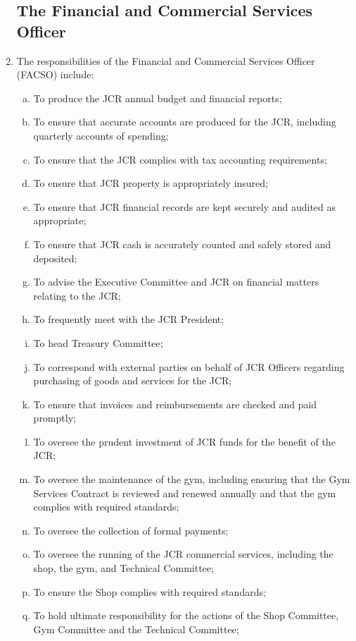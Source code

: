 \documentclass[12pt]{article}
\begin{document}
\begin{enumerate}
    \subsection{The Financial and Commercial Services Officer}
    \item The responsibilities of the Financial and Commercial Services Officer (FACSO) include:
    \begin{enumerate}[(a)]
        \item To produce the JCR annual budget and financial reports;
        \item To ensure that accurate accounts are produced for the JCR, including quarterly accounts of spending;
        \item To ensure that the JCR complies with tax accounting requirements;
        \item To ensure that JCR property is appropriately insured;
        \item To ensure that JCR financial records are kept securely and audited as appropriate;
        \item To ensure that JCR cash is accurately counted and safely stored and deposited;
        \item To advise the Executive Committee and JCR on financial matters relating to the JCR;
        \item To frequently meet with the JCR President;
        \item To head Treasury Committee;
        \item To correspond with external parties on behalf of JCR Officers regarding purchasing of goods and services for the JCR;
        \item To ensure that invoices and reimbursements are checked and paid promptly;
        \item To oversee the prudent investment of JCR funds for the benefit of the JCR;
        \item To oversee the maintenance of the gym, including ensuring that the Gym Services Contract is reviewed and renewed annually and that the gym complies with required standards;
        \item To oversee the collection of formal payments;
        \item To oversee the running of the JCR commercial services, including the shop, the gym, and Technical Committee;
        \item To ensure the Shop complies with required standards;
        \item To hold ultimate responsibility for the actions of the Shop Committee, Gym Committee and the Technical Committee;

\end{enumerate}
\end{enumerate}
\end{document}

